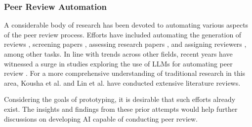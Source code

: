 
\subsubsection{Peer Review Automation}

A considerable body of research has been devoted to automating various aspects of the peer review process. Efforts have included automating the generation of reviews \cite{yuan2022can,yuan2022kid,wang2020reviewrobot}, screening papers \cite{schulz2022future}, assessing research papers \cite{kousha2022artificial}, and assigning reviewers \cite{zhao2022reviewer}, among other tasks. In line with trends across other fields, recent years have witnessed a surge in studies exploring the use of LLMs for automating peer review \cite{wexin2023can,liu2023reviewergpt,robertson2023gpt4,hosseini2023fighting}. For a more comprehensive understanding of traditional research in this area, Kousha et al. \cite{kousha2022artificial} and Lin et al. \cite{lin2021automated1} have conducted extensive literature reviews.

Considering the goals of prototyping, it is desirable that such efforts already exist. The insights and findings from these prior attempts would help further discussions on developing AI capable of conducting peer review. 



